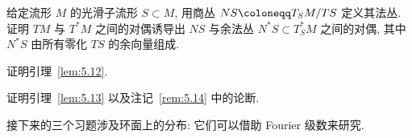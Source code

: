 \begin{exer}[法丛与余法丛]\label{ex:5.8}
给定流形 $M$ 的光滑子流形 $S \subset M$, 用商丛 $N S \defeq T_S M / T S$ 定义其法丛. 证明 $TM$ 与 $T^* M$ 之间的对偶诱导出 $N S$ 与余法丛 $N^* S \subset T_S^* M$ 之间的对偶, 其中 $N^* S$ 由所有零化 $T S$ 的余向量组成.
\end{exer}

\begin{exer}[密度丛的性质]\label{ex:5.9}
证明引理~\ref{lem:5.12}.
\end{exer}

\begin{exer}[密度的拉回]\label{ex:5.10}
证明引理~\ref{lem:5.13} 以及注记~\ref{rem:5.14} 中的论断.
\end{exer}

接下来的三个习题涉及环面上的分布: 它们可以借助 Fourier 级数来研究.

